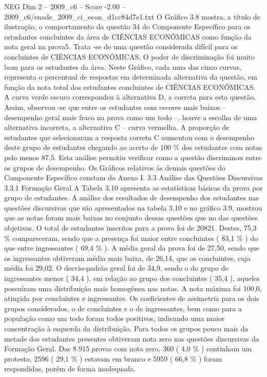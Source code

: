 \begin{textsample}{NEG Dim 2 – 2009\_c6 – Score -2.00 – 2009\_c6/enade\_2009\_ci\_econ\_d1cc84d7e1.txt}
O Gráfico 3.8 mostra, a título de ilustração, o comportamento da questão 34 do Componente Específico para os estudantes concluintes da área de CIÊNCIAS ECONÔMICAS como função da nota geral na prova5.
Trata -se de uma questão considerada difícil para os concluintes de CIÊNCIAS ECONÔMICAS.
O poder de discriminação foi muito bom para os estudantes da área.
Neste Gráfico, cada uma das cinco curvas, representa o percentual de respostas em determinada alternativa da questão, em função da nota total dos estudantes concluintes de CIÊNCIAS ECONÔMICAS.
A curva verde escuro correspondeu à alternativa D, a correta para esta questão.
Assim, observou -se que entre os estudantes com escores mais baixos – desempenho geral mais fraco na prova como um todo –, houve a escolha de uma alternativa incorreta, a alternativa C – curva vermelha.
A proporção de estudantes que selecionaram a resposta correta C aumentou com o desempenho deste grupo de estudantes chegando ao acerto de 100 \% dos estudantes com notas pelo menos 87,5.
Esta análise permitiu verificar como a questão discriminou entre os grupos de desempenho.
Os Gráficos relativos às demais questões do Componente Específico constam do Anexo I. 3.3 Análise das Questões Discursivas 3.3.1 Formação Geral A Tabela 3.10 apresenta as estatísticas básicas da prova por grupo de estudantes.
A análise dos resultados de desempenho dos estudantes nas questões discursivas que são apresentados na tabela 3.10 e no gráfico 3.9, mostrou que as notas foram mais baixas no conjunto dessas questões que no das questões objetivas.
O total de estudantes inscritos para a prova foi de 20821.
Destes, 75,3 \% compareceram, sendo que a presença foi maior entre concluintes ( 83,1 \% ) do que entre ingressantes ( 69,4 \% ).
A média geral da prova foi de 27,50, sendo que os ingressantes obtiveram média mais baixa, de 26,14, que os concluintes, cuja média foi 29,02.
O desvio-padrão geral foi de 34,9, sendo o do grupo de ingressantes menor ( 34,4 ), em relação ao grupo dos concluintes ( 35,4 ), aqueles possuíram uma distribuição mais homogênea nas notas.
A nota máxima foi 100,0, atingida por concluintes e ingressantes.
Os coeficientes de assimetria para os dois grupos considerados, o de concluintes e o de ingressantes, bem como para a população como um todo foram todos positivos, indicando uma maior concentração à esquerda da distribuição.
Para todos os grupos pouco mais da metade dos estudantes presentes obtiveram nota zero nas questões discursivas da Formação Geral.
Das 8.915 provas com nota zero, 360 ( 4,0 \% ) continham um protesto, 2596 ( 29,1 \% ) estavam em branco e 5959 ( 66,8 \% ) foram respondidas, porém de forma inadequada.

\end{textsample}
